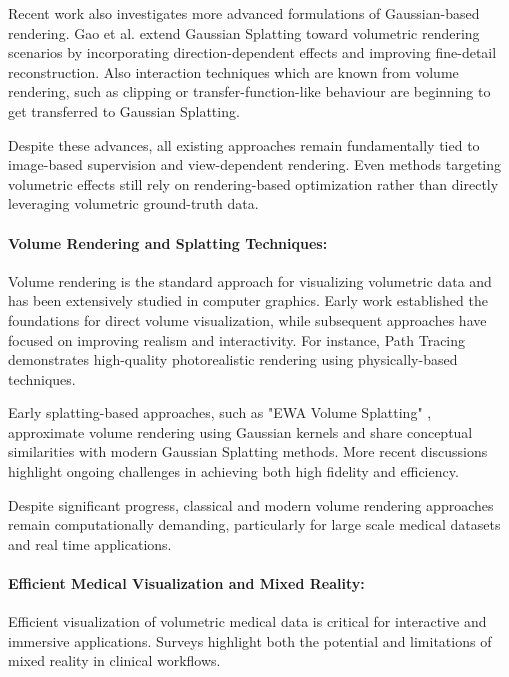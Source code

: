 \documentclass[runningheads]{llncs}
\begin{document}
Recent work also investigates more advanced formulations of Gaussian-based rendering. Gao et al. \cite{ddgsct2024,sixdgs2024} extend Gaussian Splatting toward volumetric rendering scenarios by incorporating direction-dependent effects and improving fine-detail reconstruction. Also interaction techniques which are known from volume rendering, such as clipping \cite{raraclipper2025} or transfer-function-like behaviour \cite{ivrgs2025} are beginning to get transferred to Gaussian Splatting.

Despite these advances, all existing approaches remain fundamentally tied to image-based supervision and view-dependent rendering. Even methods targeting volumetric effects still rely on rendering-based optimization rather than directly leveraging volumetric ground-truth data.



\paragraph{Volume Rendering and Splatting Techniques:}

Volume rendering is the standard approach for visualizing volumetric data and has been extensively studied in computer graphics. Early work \cite{drebin1988volume} established the foundations for direct volume visualization, while subsequent approaches have focused on improving realism and interactivity. For instance, Path Tracing \cite{kroes2012exposure} demonstrates high-quality photorealistic rendering using physically-based techniques.

Early splatting-based approaches, such as "EWA Volume Splatting" \cite{ewasplatting2001}, approximate volume rendering using Gaussian kernels and share conceptual similarities with modern Gaussian Splatting methods. More recent discussions \cite{cgf2025gs} highlight ongoing challenges in achieving both high fidelity and efficiency.

Despite significant progress, classical and modern volume rendering approaches remain computationally demanding, particularly for large scale medical datasets and real time applications.



\paragraph{Efficient Medical Visualization and Mixed Reality:}


Efficient visualization of volumetric medical data is critical for interactive and immersive applications. Surveys \cite{mrreview2024,mrreview2} highlight both the potential and limitations of mixed reality in clinical workflows.
\end{document}
